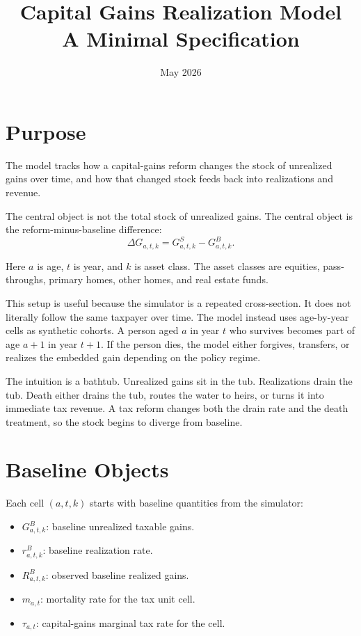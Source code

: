 \documentclass[11pt]{article}
\title{Capital Gains Realization Model\\A Minimal Specification}
\author{}
\date{May 2026}
\newcommand{\GB}{G^B}
\newcommand{\GS}{G^S}
\newcommand{\dG}{\Delta G}
\newcommand{\RB}{R^B}
\begin{document}
\maketitle

\section{Purpose}

The model tracks how a capital-gains reform changes the stock of unrealized
gains over time, and how that changed stock feeds back into realizations and
revenue.

The central object is not the total stock of unrealized gains. The central
object is the reform-minus-baseline difference:
\[
\dG_{a,t,k} = \GS_{a,t,k} - \GB_{a,t,k}.
\]

Here $a$ is age, $t$ is year, and $k$ is asset class. The asset classes are
equities, pass-throughs, primary homes, other homes, and real estate funds.

This setup is useful because the simulator is a repeated cross-section. It
does not literally follow the same taxpayer over time. The model instead
uses age-by-year cells as synthetic cohorts. A person aged $a$ in year $t$
who survives becomes part of age $a+1$ in year $t+1$. If the person dies,
the model either forgives, transfers, or realizes the embedded gain depending
on the policy regime.

The intuition is a bathtub. Unrealized gains sit in the tub. Realizations
drain the tub. Death either drains the tub, routes the water to heirs, or
turns it into immediate tax revenue. A tax reform changes both the drain rate
and the death treatment, so the stock begins to diverge from baseline.

\section{Baseline Objects}

Each cell $(a,t,k)$ starts with baseline quantities from the simulator:

\begin{itemize}
  \item $\GB_{a,t,k}$: baseline unrealized taxable gains.
  \item $r^B_{a,t,k}$: baseline realization rate.
  \item $\RB_{a,t,k}$: observed baseline realized gains.
  \item $m_{a,t}$: mortality rate for the tax unit cell.
  \item $\tau_{a,t}$: capital-gains marginal tax rate for the cell.
\end{itemize}
\end{document}
